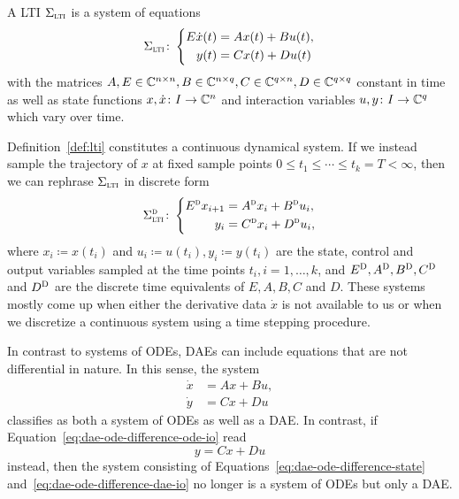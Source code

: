 \begin{definition}\label{def:lti}
    A \acl{LTI} $\Sigma_{\textnormal{\scshape lti}}$ is a system of equations
    \begin{equation}\label{eq:lti}
        \Sigma_{\textnormal{\scshape lti}} \colon \left\lbrace
        \begin{aligned}
            E \dot{x}(t) &= A x(t) + B u(t), \\
            y(t) &= C x(t) + D u(t)
        \end{aligned}
        \right.
    \end{equation}
    with the matrices $A, E \in \mathbb{C}^{n \times n}, B \in \mathbb{C}^{n \times q}, C \in \mathbb{C}^{q \times n}, D \in \mathbb{C}^{q \times q}$ constant in time as well as state functions $x, \dot{x} \colon I \to \mathbb{C}^n$ and interaction variables $u, y \colon I \to \mathbb{C}^q$ which vary over time.
\end{definition}

\begin{remark}
    Definition~\ref{def:lti} constitutes a continuous dynamical system.
    If we instead sample the trajectory of $x$ at fixed sample points $0 \leq t_1 \leq \cdots \leq t_k = T < \infty$, then we can rephrase $\Sigma_{\textnormal{\scshape lti}}$ in discrete form
    \begin{equation*}
        \Sigma_{\textnormal{\scshape lti}}^{\textnormal{\scshape d}} \colon \left\lbrace
        \begin{aligned}
            E^{\textnormal{\scshape d}} x_{i + 1} &= A^{\textnormal{\scshape d}} x_i + B^{\textnormal{\scshape d}} u_i, \\
            y_i &= C^{\textnormal{\scshape d}} x_i + D^{\textnormal{\scshape d}} u_i,
        \end{aligned}
        \right.
    \end{equation*}
    where $x_i \coloneqq x(t_i)$ and $u_i \coloneqq u(t_i), y_i \coloneqq y(t_i)$ are the state, control and output variables sampled at the time points $t_i, i = 1, \dots, k$, and $E^{\textnormal{\scshape D}}, A^{\textnormal{\scshape D}}, B^{\textnormal{\scshape D}}, C^{\textnormal{\scshape D}}$ and $D^{\textnormal{\scshape D}}$ are the discrete time equivalents of $E, A, B, C$ and $D$.
    These systems mostly come up when either the derivative data $\dot{x}$ is not available to us or when we discretize a continuous system using a time stepping procedure.
\end{remark}

\begin{remark}
    In contrast to systems of \acp{ODE}, \acp{DAE} can include equations that are not differential in nature.
    In this sense, the system
    \begin{align}
        \dot{x} &= A x + B u, \label{eq:dae-ode-difference-state}\\
        \dot{y} &= C x + D u\label{eq:dae-ode-difference-ode-io}
    \end{align}
    classifies as both a system of \acp{ODE} as well as a \ac{DAE}.
    In contrast, if Equation~\eqref{eq:dae-ode-difference-ode-io} read
    \begin{equation}\label{eq:dae-ode-difference-dae-io}
        y = C x + D u
    \end{equation}
    instead, then the system consisting of Equations~\eqref{eq:dae-ode-difference-state} and~\eqref{eq:dae-ode-difference-dae-io} no longer is a system of \acp{ODE} but only a \ac{DAE}.
\end{remark}

